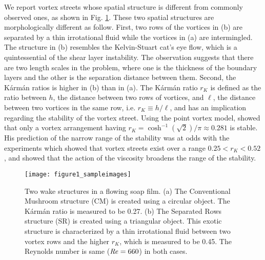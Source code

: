 \documentclass[english, aps, prl, longbibliography, preprint]{revtex4-1}
\newcommand\citepar\citep
\newcommand\citebyname\citet
\newcommand\Reynolds{{\it Re}}
\begin{document}
We report vortex streets whose spatial structure is different from commonly observed ones, as shown in Fig. \ref{fig:type2sample}.
These two spatial structures are morphologically different as follow.
First, two rows of the vortices in (b) are separated by a thin irrotational fluid while the vortices in (a) are intermingled.
The structure in (b) resembles the Kelvin-Stuart cat's eye flow, which is a quintessential of the shear layer instability.
The observation suggests that there are two length scales in the problem, where one is the thickness of the boundary layers and the other is the separation distance between them.
Second, the K\'{a}rm\'{a}n ratios is higher in (b) than in (a).
The K\'{a}rm\'{a}n ratio $r_K$ is defined as the ratio between $h$, the distance between two rows of vortices, and $\ell$, the distance between two vortices in the same row, i.e. $r_K\equiv h/\ell$, and has an implication regarding the stability of the vortex street.
Using the point vortex model, \citebyname{vonKarman:1911vi} showed that only a vortex arrangement having $r_K=\cosh^{-1}(\sqrt{2})/\pi\approx0.281$ is stable.
His prediction of the narrow range of the stability was at odds with the experiments which showed that vortex streets exist over a range $0.25<r_{K}<0.52$ \citepar{Goldstein-38}, and \citebyname{Hooker:1936tz} showed that the action of the viscosity broadens the range of the stability.

\begin{figure}
\begin{centering}
\texttt{[image: figure1\_sampleimages]}
\par
\end{centering}
\caption{
Two wake structures in a flowing soap film. 
(a) The Conventional Mushroom structure (CM) is created using a circular object.
The K\'{a}rm\'{a}n ratio is measured to be 0.27. 
(b) The Separated Rows structure (SR) is created using a triangular object. 
This exotic structure is characterized by a thin irrotational fluid between two vortex rows and the higher $r_K$, which is measured to be 0.45.
The Reynolds number is same ($\Reynolds=660$) in both cases.
\label{fig:type2sample}}
\end{figure}
\end{document}
